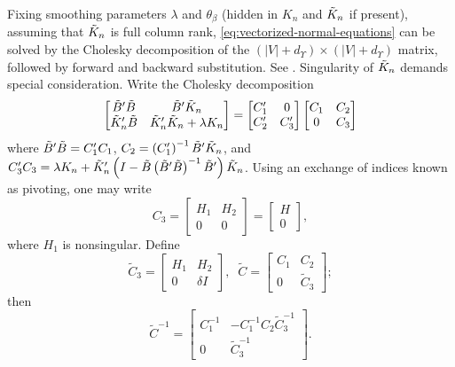 Fixing smoothing parameters $\lambda$ and $\theta_\beta$ (hidden in $K_n$ and $\tilde{K}_n$ if present), assuming that $\tilde{K}_n$ is full column rank, \eqref{eq:vectorized-normal-equations} can be solved by the Cholesky decomposition of the $\left( \vert V \vert + d_\Upsilon \right) \times \left( \vert V \vert + d_\Upsilon \right)$ matrix, followed by forward and backward substitution. See \cite{golub2012matrix}. Singularity of $\tilde{K}_n$ demands special consideration. Write the Cholesky decomposition
\begin{equation} \label{eq:normal-equation-cholesky}
\begin{bmatrix}
\tilde{B}'\tilde{B} & \tilde{B}'\tilde{K}_n \\
\tilde{K}_n'\tilde{B} & \tilde{K}_n'\tilde{K}_n + \lambda K_n\\
\end{bmatrix}
= \begin{bmatrix}
C'_1 & 0 \\
C'_2  & C'_3 
\end{bmatrix}
\begin{bmatrix}
C_1 & C_2 \\
0  & C_3 
\end{bmatrix}
\end{equation}
\noindent
where $\tilde{B}'\tilde{B} = C'_1 C_1$, $C_2 = \left(C'_1\right)^{-1} \tilde{B}' \tilde{K}_n$, and $C'_3 C_3 = \lambda K_n +  \tilde{K}_n'\left( I - \tilde{B}\left( \tilde{B}' \tilde{B} \right)^{-1} \tilde{B}' \right)\tilde{K}_n$. Using an exchange of indices known as pivoting, one may write 
\begin{equation*}
C_3 = \begin{bmatrix} H_1 & H_2 \\ 0 & 0 \end{bmatrix} = \begin{bmatrix} H \\  0 \end{bmatrix},
\end{equation*}
\noindent
where $H_1$ is nonsingular. Define
\begin{equation} \label{eq:cholesky-factor-mod}
\tilde{C}_3 = \begin{bmatrix}
H_1 & H_2 \\
0  & \delta I 
\end{bmatrix}, \;\;
\tilde{C} = \begin{bmatrix}
C_1 & C_2 \\
0  & \tilde{C}_3 
\end{bmatrix};
\end{equation}
\noindent
then
\begin{equation} \label{eq:cholesky-factor-mod-inverse}
\tilde{C}^{-1} = \begin{bmatrix}
C_1^{-1} & -C_1^{-1} C_2 \tilde{C}_3^{-1} \\
0  & \tilde{C}_3^{-1}
\end{bmatrix}.
\end{equation}

